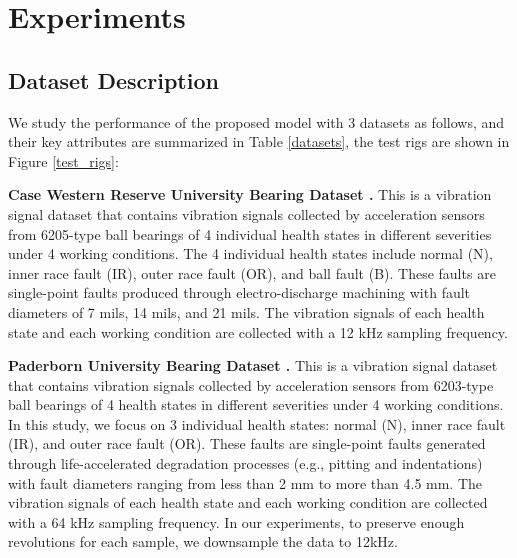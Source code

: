 \documentclass{article}
\begin{document}
	\section{Experiments}
	\subsection{Dataset Description}
	We study the performance of the proposed model with 3 datasets as follows, and their key attributes are summarized in Table \ref{datasets}, the test rigs are shown in Figure \ref{test_rigs}:
	
	\textbf{Case Western Reserve University Bearing Dataset \cite{RN19}.} This is a vibration signal dataset that contains vibration signals collected by acceleration sensors from 6205-type ball bearings of 4 individual health states in different severities under 4 working conditions. The 4 individual health states include normal (N), inner race fault (IR), outer race fault (OR), and ball fault (B). These faults are single-point faults produced through electro-discharge machining with fault diameters of 7 mils, 14 mils, and 21 mils. The vibration signals of each health state and each working condition are collected with a 12 kHz sampling frequency.
	
	\textbf{Paderborn University Bearing Dataset \cite{RN8}.} This is a vibration signal dataset that contains vibration signals collected by acceleration sensors from 6203-type ball bearings of 4 health states in different severities under 4 working conditions. In this study, we focus on 3 individual health states: normal (N), inner race fault (IR), and outer race fault (OR). These faults are single-point faults generated through life-accelerated degradation processes (e.g., pitting and indentations) with fault diameters ranging from less than 2 mm to more than 4.5 mm. The vibration signals of each health state and each working condition are collected with a 64 kHz sampling frequency. In our experiments, to preserve enough revolutions for each sample, we downsample the data to 12kHz.
	
\end{document}
